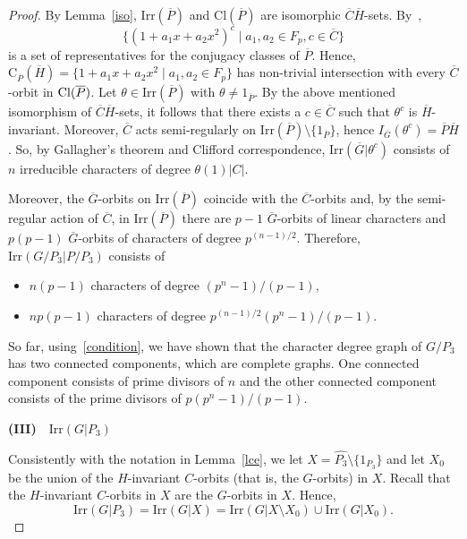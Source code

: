 \documentclass{amsart}
\def\cent#1#2{\mathrm{C}_{{#1}}{{(#2)}}}
\def\irr#1{\mathrm{Irr}(#1)}
\def\cl#1{\mathrm{Cl}(#1)}
\begin{document}
\begin{proof}
By Lemma~\ref{iso},  $\irr{\overline{P}}$  and   $\cl{\overline{P}}$  are isomorphic $\overline{C}\overline{H}$-sets.
By~\cite[Theorem 4.1]{HO}, $$\{ (1+a_1 x + a_2 x^2)^c \mid a_1, a_2 \in F_p, c \in \overline{C} \}$$ is  a set of
representatives for the conjugacy classes of $\overline{P}$.
Hence,  $\cent{\overline{P}}{\overline{H}} = \{ 1+a_1 x + a_2 x^2 \mid a_1, a_2 \in F_p\}$
has non-trivial intersection
with every $\overline{C}$-orbit in  ${\rm Cl}(\overline{P})$.
Let $\theta \in \irr{\overline{P}}$ with $\theta \neq 1_{\overline{P}}$.
By the above mentioned  isomorphism of $\overline{C}\overline{H}$-sets, it follows that  there
exists a $c \in \overline{C}$ such that $\theta^c$ is $\overline{H}$-invariant.
Moreover, $\overline{C}$ acts semi-regularly on $\irr{\overline P} \setminus \{1_{\overline P} \}$,
hence  $I_{\overline{G}}(\theta^c) =\overline{P}\overline{H}$.
So, by Gallagher's theorem and Clifford correspondence, $\irr{\overline{G}|\theta^c}$ consists of $n$ irreducible characters of degree $\theta(1)|C|$.

Moreover, the $\overline{G}$-orbits
on $\irr{\overline{P}}$ coincide with the $\overline{C}$-orbits and,
by the semi-regular action of $\overline{C}$,
in $\irr{\overline{P}}$ there are $p-1$ $\overline{G}$-orbits of linear characters and $p(p-1)$ $\overline{G}$-orbits of characters of degree $p^{(n-1)/2}$.
Therefore, $\mathrm{Irr}(G/P_3| P/P_3)$ consists of
\begin{itemize}
\item $n(p-1)$ characters of degree $(p^n-1)/(p-1)$,
\item $np(p-1)$ characters of degree $p^{(n-1)/2}(p^n-1)/(p-1)$.
\end{itemize}

So far, using~\eqref{condition}, we have shown that the character degree graph of $G/P_3$ has two connected components, which are complete graphs. One connected component consists of prime divisors of $n$ and the other connected component consists of the prime divisors of $p(p^n-1)/(p-1)$.

\medskip
{\bf (III)}~~$\mathrm{Irr}(G| P_3)$

\smallskip
Consistently with the notation in Lemma~\ref{lce}, we let $X = \widehat{P_3} \setminus \{ 1_{P_3}\} $ and let $X_0$ be the union of the $H$-invariant $C$-orbits (that is, the $G$-orbits) in $X$. Recall that the $H$-invariant $C$-orbits in $X$ are the $G$-orbits in $X$.
Hence,   $$\mathrm{Irr}(G| P_3) = \mathrm{Irr}(G|X) =\mathrm{Irr}(G|X \setminus X_0) \cup \mathrm{Irr}(G|X_0) .$$


\end{proof}
\end{document}

